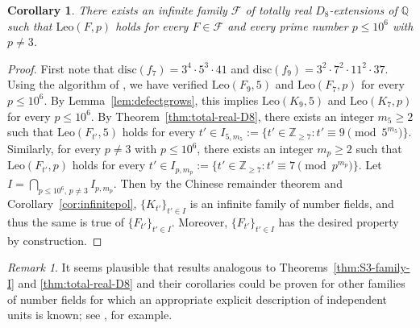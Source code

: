 \documentclass[12pt]{amsart}
\theoremstyle{plain}
\newtheorem{corollary}[theorem]{Corollary}
\theoremstyle{remark}
\newtheorem{remark}[theorem]{Remark}
\theoremstyle{definition}
\newcommand{\Z}{\mathbb{Z}}
\newcommand{\Q}{\mathbb{Q}}
\newcommand{\Leo}{\mathrm{Leo}}
\numberwithin{equation}{section}
\begin{document}
\begin{corollary}\label{cor:total-real-D8}
There exists an infinite family $\mathcal{F}$ of totally real $D_{8}$-extensions of $\Q$
such that $\Leo(F,p)$ holds for every $F \in \mathcal{F}$ and every prime number $p \leq 10^{6}$ with $p \neq 3$.
\end{corollary}

\begin{proof}
First note that $\mathrm{disc}(f_{7}) = 3^{4} \cdot 5^{3} \cdot 41$ 
and $\mathrm{disc}(f_{9}) = 3^{2}\cdot 7^{2} \cdot 11^{2} \cdot 37$.
Using the algorithm of  \cite[Appendix A.1]{MR4111943}, we have verified 
$\Leo(F_{9},5)$ and $\Leo(F_{7},p)$ for every $p \leq 10^{6}$. 
By Lemma~\ref{lem:defectgrows}, this implies $\Leo(K_{9},5)$ and $\Leo(K_{7},p)$ for every $p \leq 10^{6}$.
By Theorem~\ref{thm:total-real-D8}, there exists an integer $m_{5} \geq 2$ such that $\Leo(F_{t'},5)$ holds for
every $t' \in I_{5,m_{5}} := \{ t' \in \Z_{\geq 7} : t' \equiv 9 \pmod{5^{m_{5}}} \}$.
Similarly, for every $p \neq 3$ with $p \leq 10^{6}$, there exists an integer $m_{p} \geq 2$ such that 
$\Leo(F_{t'},p)$ holds for
every $t' \in I_{p,m_{p}} := \{ t' \in \Z_{\geq 7} : t' \equiv 7 \pmod{p^{m_{p}}} \}$.
Let $I = \bigcap_{p \leq 10^{6}, \, p \neq 3} I_{p,m_{p}}$. 
Then by the Chinese remainder theorem and Corollary~\ref{cor:infinitepol}, $\{ K_{t'} \}_{t' \in I}$ 
is an infinite family of number fields, and thus the same is true of $\{ F_{t'} \}_{t' \in I}$. 
Moreover, $\{ F_{t'} \}_{t' \in I}$ has the desired property by construction.
\end{proof}

\begin{remark}
It seems plausible that results analogous to Theorems~\ref{thm:S3-family-I} and 
\ref{thm:total-real-D8} and their corollaries could be proven for other families of number fields 
for which an appropriate explicit description of independent units is known; 
see \cite{MR246851,MR319941,MR546663}, for example.
\end{remark}


{}

\end{document}
